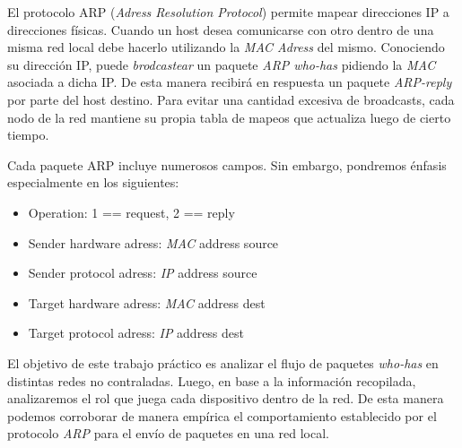 El protocolo ARP (\emph{Adress Resolution Protocol}) permite mapear direcciones IP a direcciones
físicas. Cuando un host desea comunicarse con otro dentro de una misma red local debe hacerlo
utilizando la \emph{MAC Adress} del mismo. Conociendo su dirección IP, puede \emph{brodcastear} un
paquete \emph{ARP who-has} pidiendo la \emph{MAC} asociada a dicha IP. De esta manera recibirá en
respuesta un paquete \emph{ARP-reply} por parte del host destino.
Para evitar una cantidad excesiva de broadcasts, cada nodo de la red mantiene su propia tabla de
mapeos que actualiza luego de cierto tiempo.

Cada paquete ARP incluye numerosos campos. Sin embargo, pondremos énfasis especialmente en los 
siguientes:
\begin{itemize}
    \item Operation: 1 == request, 2 == reply
    \item Sender hardware adress: \emph{MAC} address source
    \item Sender protocol adress: \emph{IP} address source
    \item Target hardware adress: \emph{MAC} address dest
    \item Target protocol adress: \emph{IP} address dest
\end{itemize}

El objetivo de este trabajo práctico es analizar el flujo de paquetes \emph{who-has} en distintas
redes no contraladas. Luego, en base a la informaci\'on recopilada, analizaremos el rol que juega
cada dispositivo dentro de la red. De esta manera podemos corroborar de manera empírica el 
comportamiento establecido por el protocolo \emph{ARP} para el envío de paquetes en una red local.  
